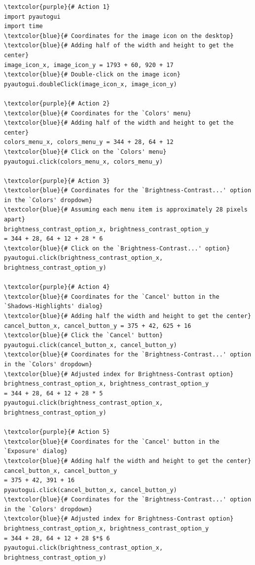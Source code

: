 \begin{tcolorbox}[title={GIMP Task: \textit{Could you tone down the brightness of my photo?}}]

\begin{Verbatim}[commandchars=\\\{\}]
\textcolor{purple}{# Action 1}
import pyautogui
import time
\textcolor{blue}{# Coordinates for the image icon on the desktop}
\textcolor{blue}{# Adding half of the width and height to get the center}
image_icon_x, image_icon_y = 1793 + 60, 920 + 17  
\textcolor{blue}{# Double-click on the image icon}
pyautogui.doubleClick(image_icon_x, image_icon_y)

\textcolor{purple}{# Action 2}
\textcolor{blue}{# Coordinates for the `Colors' menu}
\textcolor{blue}{# Adding half of the width and height to get the center}
colors_menu_x, colors_menu_y = 344 + 28, 64 + 12  
\textcolor{blue}{# Click on the `Colors' menu}
pyautogui.click(colors_menu_x, colors_menu_y)

\textcolor{purple}{# Action 3}
\textcolor{blue}{# Coordinates for the `Brightness-Contrast...' option in the `Colors' dropdown}
\textcolor{blue}{# Assuming each menu item is approximately 28 pixels apart}
brightness_contrast_option_x, brightness_contrast_option_y 
= 344 + 28, 64 + 12 + 28 * 6  
\textcolor{blue}{# Click on the `Brightness-Contrast...' option}
pyautogui.click(brightness_contrast_option_x, brightness_contrast_option_y)

\textcolor{purple}{# Action 4}
\textcolor{blue}{# Coordinates for the `Cancel' button in the `Shadows-Highlights' dialog}
\textcolor{blue}{# Adding half the width and height to get the center}
cancel_button_x, cancel_button_y = 375 + 42, 625 + 16  
\textcolor{blue}{# Click the `Cancel' button}
pyautogui.click(cancel_button_x, cancel_button_y)
\textcolor{blue}{# Coordinates for the `Brightness-Contrast...' option in the `Colors' dropdown}
\textcolor{blue}{# Adjusted index for Brightness-Contrast option}
brightness_contrast_option_x, brightness_contrast_option_y 
= 344 + 28, 64 + 12 + 28 * 5  
pyautogui.click(brightness_contrast_option_x, brightness_contrast_option_y)

\textcolor{purple}{# Action 5}
\textcolor{blue}{# Coordinates for the `Cancel' button in the `Exposure' dialog}
\textcolor{blue}{# Adding half the width and height to get the center}
cancel_button_x, cancel_button_y 
= 375 + 42, 391 + 16  
pyautogui.click(cancel_button_x, cancel_button_y)
\textcolor{blue}{# Coordinates for the `Brightness-Contrast...' option in the `Colors' dropdown}
\textcolor{blue}{# Adjusted index for Brightness-Contrast option}
brightness_contrast_option_x, brightness_contrast_option_y 
= 344 + 28, 64 + 12 + 28 $*$ 6  
pyautogui.click(brightness_contrast_option_x, brightness_contrast_option_y)


\end{Verbatim}
\end{tcolorbox}
